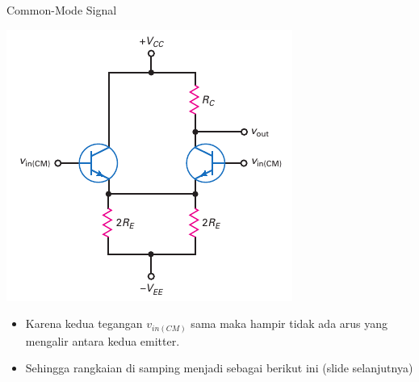 \documentclass[aspectratio=169]{beamer}
\begin{document}
\begin{frame}{Common-Mode Signal}
	\begin{multicols}{2}
		\begin{center}
			\includegraphics[height=0.7\textheight]{gambar/01.equivalent_circuit_commonmode}
		\end{center}
		\columnbreak
		\begin{itemize}
			\item Karena kedua tegangan $ v_{in(CM)} $ sama maka hampir tidak ada arus yang mengalir antara kedua emitter.
			\item Sehingga rangkaian di samping menjadi sebagai berikut ini (slide selanjutnya)
		\end{itemize}
	\end{multicols}
\end{frame}
\end{document}
